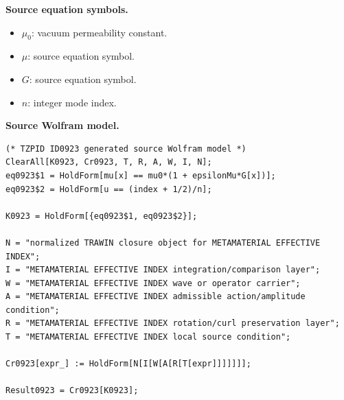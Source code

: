 \begin{minipage}[t]{0.49\linewidth}
\begingroup
\small
\raggedright
\textbf{Source equation symbols.}\par
\begin{itemize}[leftmargin=1.35em,itemsep=1pt,topsep=1pt,parsep=0pt]
    \item $\mu_{0}$: vacuum permeability constant.
    \item $\mu$: source equation symbol.
    \item $G$: source equation symbol.
    \item $n$: integer mode index.
\end{itemize}
\endgroup
\end{minipage}\hfill
\begin{minipage}[t]{0.47\linewidth}
\begingroup
\scriptsize
\raggedright
\textbf{Source Wolfram model.}\par
\begin{Verbatim}[fontsize=\tiny,breaklines=true,breakanywhere=true]
(* TZPID ID0923 generated source Wolfram model *)
ClearAll[K0923, Cr0923, T, R, A, W, I, N];
eq0923$1 = HoldForm[mu[x] == mu0*(1 + epsilonMu*G[x])];
eq0923$2 = HoldForm[u == (index + 1/2)/n];

K0923 = HoldForm[{eq0923$1, eq0923$2}];

N = "normalized TRAWIN closure object for METAMATERIAL EFFECTIVE INDEX";
I = "METAMATERIAL EFFECTIVE INDEX integration/comparison layer";
W = "METAMATERIAL EFFECTIVE INDEX wave or operator carrier";
A = "METAMATERIAL EFFECTIVE INDEX admissible action/amplitude condition";
R = "METAMATERIAL EFFECTIVE INDEX rotation/curl preservation layer";
T = "METAMATERIAL EFFECTIVE INDEX local source condition";

Cr0923[expr_] := HoldForm[N[I[W[A[R[T[expr]]]]]]];

Result0923 = Cr0923[K0923];
\end{Verbatim}
\endgroup
\end{minipage}

